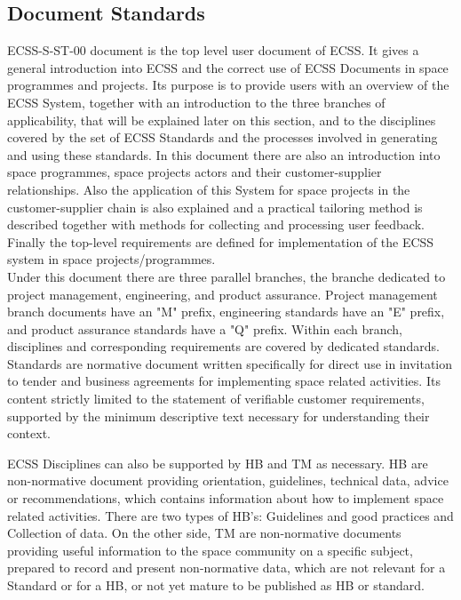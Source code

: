 {\subsection{Document Standards}
ECSS-S-ST-00\cite{ecss-s-st-00c} document is the top level user document of \ac{ECSS}.
It gives a general introduction into \ac{ECSS} and the correct use of \ac{ECSS} Documents in space
programmes and projects.
Its purpose is to provide users with an overview of the \ac{ECSS} System, together
with an introduction to the three branches of applicability, that will be explained later on this section, and to the disciplines
covered by the set of \ac{ECSS} Standards and the processes involved in generating
and using these standards.
In this document there are also an introduction into space programmes, space projects actors and their
customer-supplier relationships. Also the application of this System for space projects in the customer-supplier
chain is also explained and a practical tailoring method is described together with
methods for collecting and processing user feedback.
Finally the top-level requirements are defined for implementation of the \ac{ECSS}
system in space projects/programmes\cite{ecss-s-st-00c}.\\

Under this document there are three parallel branches, the branche dedicated to project management,
engineering, and product assurance.
Project management branch documents have an "M" prefix, engineering standards have an "E" prefix, and product assurance standards have a "Q" prefix.
Within each branch, disciplines and corresponding requirements are covered by dedicated standards.
Standards are normative document written specifically for direct use in invitation to tender and 
business agreements for implementing space related activities. Its content 
strictly limited to the statement of verifiable customer requirements, supported 
by the minimum descriptive text necessary for understanding their context.

\ac{ECSS} Disciplines can also be supported by \ac{HB} and \ac{TM} as necessary\cite{ecss-s-st-00c}.
\ac{HB} are non-normative document providing orientation, 
guidelines, technical data, advice or recommendations, which contains 
information about how to implement space related activities. There are two types of \ac{HB}'s: Guidelines and good practices and Collection of data.
On the other side, \ac{TM} are non-normative documents providing useful information to the space community 
on a specific subject, prepared to record and present non-normative data, which 
are not relevant for a Standard or for a \ac{HB}, or not yet mature to be published as \ac{HB} or standard.

}
